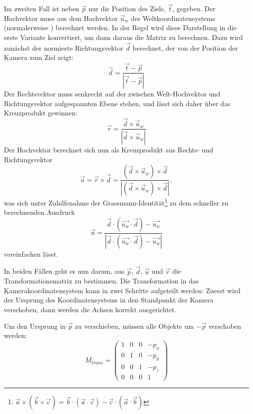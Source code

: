 Im zweiten Fall ist neben $\vec p$ nur die Position des Ziels, $\vec t$, gegeben. Der Hochvektor muss aus dem Hochvektor $\vec u_w$ des Weltkoordinatensystems (normalerweise ) berechnet werden. In der Regel wird diese Darstellung in die erste Variante konvertiert, um dann daraus die Matrix zu berechnen. Dazu wird zunächst der normierte Richtungsvektor $\vec d$ berechnet, der von der Position der Kamera zum Ziel zeigt:
\begin{equation}
 \vec d = \frac{\vec t - \vec p}{\left| \vec t - \vec p \right|}
\end{equation}
Der Rechtsvektor muss senkrecht auf der zwischen Welt-Hochvektor und Richtungsvektor aufgespannten Ebene stehen, und lässt sich daher über das Kreuzprodukt gewinnen:
\begin{equation}
 \vec r = \frac{\vec d \times \vec u_w}{\left| \vec d \times \vec u_w \right|}
\end{equation} 
Der Hochvektor berechnet sich nun als Kreuzprodukt aus Rechts- und Richtungsvektor
\begin{equation}
 \vec u = \vec r \times \vec d = \frac{\left( \vec d \times \vec u_w \right) \times \vec d}{\left| \left( \vec d \times \vec u_w \right) \times \vec d \right|},
\end{equation} 
was sich unter Zuhilfenahme der Grassmann-Identität\footnote{$\vec a \times ( \vec b \times \vec c ) = \vec b \cdot ( \vec a \cdot \vec c ) - \vec c \cdot ( \vec a \cdot \vec b)$} zu dem schneller zu berechnenden Ausdruck
\begin{equation}
 \vec u = \frac{ \vec{d} \cdot \left( \vec{u_w} \cdot \vec{d} \right) - \vec{u_w} }{\left| \vec{d} \cdot \left( \vec{u_w} \cdot \vec{d} \right) - \vec{u_w} \right|}
\end{equation} 
vereinfachen lässt.

In beiden Fällen geht es nun darum, aus $\vec p$, $\vec d$, $\vec u$ und $\vec r$ die Transformationsmatrix zu bestimmen. Die Transformation in das Kamerakoordinatensystem kann in zwei Schritte aufgeteilt werden: Zuerst wird der Ursprung des Koordinatensystems in den Standpunkt der Kamera verschoben, dann werden die Achsen korrekt ausgerichtet.

Um den Ursprung in $\vec p$ zu verschieben, müssen alle Objekte um $-\vec p$ verschoben werden:
\begin{equation}
 M_{trans} = \begin{pmatrix}
  1 & 0 & 0 & -p_x \\
  0 & 1 & 0 & -p_y \\
  0 & 0 & 1 & -p_z \\
  0 & 0 & 0 & 1
 \end{pmatrix}
\end{equation}

